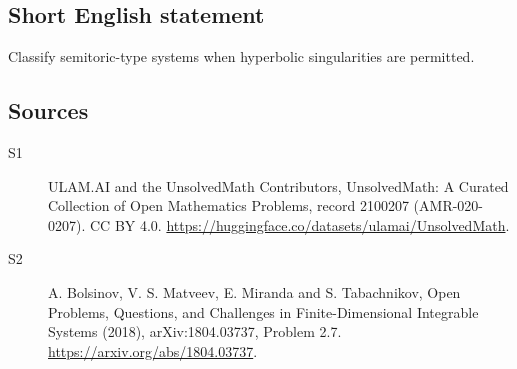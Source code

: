\documentclass[11pt]{article}
\begin{document}
\subsection{Short English statement}
Classify semitoric-type systems when hyperbolic singularities are permitted.
\subsection{Sources}
\begin{description}
\item[\hypertarget{source:2100207:1}{S1}] ULAM.AI and the UnsolvedMath Contributors, UnsolvedMath: A Curated Collection of Open Mathematics Problems, record 2100207 (AMR-020-0207). CC BY 4.0. \url{https://huggingface.co/datasets/ulamai/UnsolvedMath}.
\item[\hypertarget{source:2100207:2}{S2}] A. Bolsinov, V. S. Matveev, E. Miranda and S. Tabachnikov, Open Problems, Questions, and Challenges in Finite-Dimensional Integrable Systems (2018), arXiv:1804.03737, Problem 2.7. \url{https://arxiv.org/abs/1804.03737}.
\end{description}
\label{end:2100207}
\end{document}
